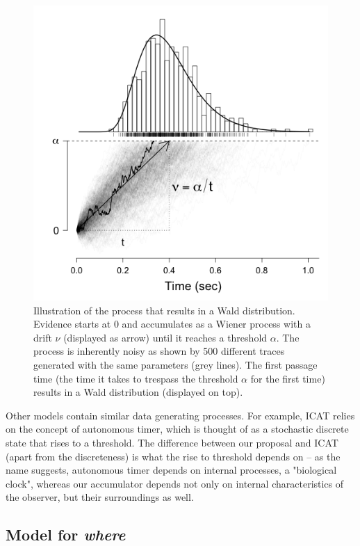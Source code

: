 \documentclass{article}
\begin{document}
\begin{figure}
    \centering
    \includegraphics[width=\linewidth]{figures/wald_distribution.png}
    \caption{Illustration of the process that results in a Wald distribution. Evidence starts at 0 and accumulates as a Wiener process with a drift $\nu$ (displayed as arrow) until it reaches a threshold $\alpha$. The process is inherently noisy as shown by 500 different traces generated with the same parameters (grey lines). The first passage time (the time it takes to trespass the threshold $\alpha$ for the first time) results in a Wald distribution (displayed on top).}
    \label{fig:wald_distribution}
\end{figure}

Other models contain similar data generating processes. For example, ICAT \citep{trukenbrod2014icat} relies on the concept of autonomous timer, which is thought of as a stochastic discrete state that rises to a threshold. The difference between our proposal and ICAT (apart from the discreteness) is what the rise to threshold depends on -- as the name suggests, autonomous timer depends on internal processes, a "biological clock", whereas our accumulator depends not only on internal characteristics of the observer, but their surroundings as well.

\subsection{Model for \textit{where}}
\end{document}
